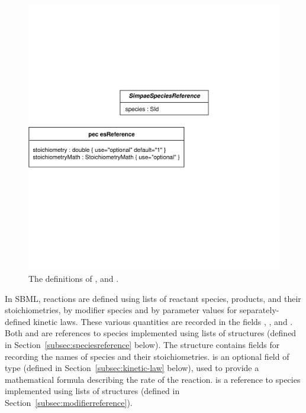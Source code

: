 \documentclass[10pt]{cekarticle}
\begin{document}
\begin{figure}[htb]
  \centering
  \includegraphics[scale = 0.68]{reaction}
  \caption{The definitions of ,  and
    .}
  \label{fig:reaction}
\end{figure}

In SBML, reactions are defined using lists of reactant species,
products, and their stoichiometries, by modifier species and by
parameter values for separately-defined kinetic laws.  These
various quantities are recorded in the fields ,
,  and .  Both
 and  are references to species
implemented using lists of  structures
(defined in Section~\ref{subsec:speciesreference} below).  The
 structure contains fields for recording
the names of species and their stoichiometries.
 is an optional field of type
 (defined in Section~\ref{subsec:kinetic-law}
below), used to provide a mathematical formula describing the rate
of the reaction.   is a reference to species
implemented using lists of  structures
(defined in Section~\ref{subsec:modifierreference}).
\end{document}
